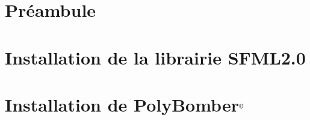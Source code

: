 \section{Préambule}


\newpage

\section{Installation de la librairie SFML2.0}


\newpage

\section{Installation de PolyBomber$^{\mbox{\scriptsize{\copyright}}}$}
